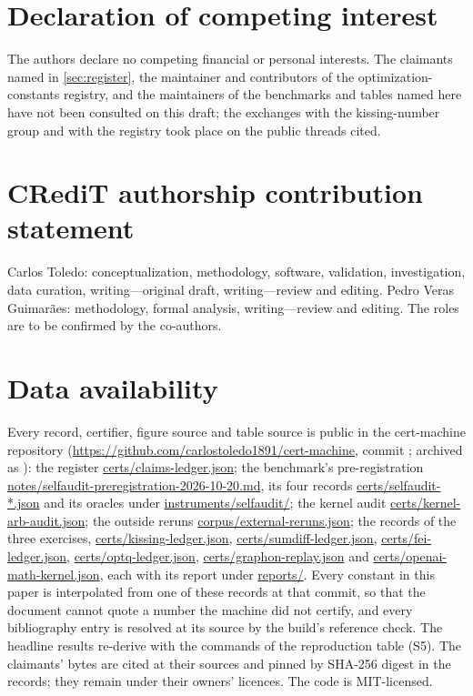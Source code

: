 \documentclass[preprint,11pt,a4paper]{elsarticle}
\theoremstyle{definition}
\newcommand{\supp}[1]{S#1}
\begin{document}
\section*{Declaration of competing interest}
The authors declare no competing financial or personal interests. The claimants named in \cref{sec:register}, the maintainer and contributors of the optimization-constants registry, and the maintainers of the benchmarks and tables named here have not been consulted on this draft; the exchanges with the kissing-number group and with the registry took place on the public threads cited.

\section*{CRediT authorship contribution statement}
Carlos Toledo: conceptualization, methodology, software, validation, investigation, data curation, writing---original draft, writing---review and editing. Pedro Veras Guimar\~aes: methodology, formal analysis, writing---review and editing. The roles are to be confirmed by the co-authors.

\section*{Data availability}
Every record, certifier, figure source and table source is public in the cert-machine repository (\url{https://github.com/carlostoledo1891/cert-machine}, commit \MtCommit; archived as \citep{CMArchive}): the register \url{certs/claims-ledger.json}; the benchmark's pre-registration \url{notes/selfaudit-preregistration-2026-10-20.md}, its four records \url{certs/selfaudit-*.json} and its oracles under \url{instruments/selfaudit/}; the kernel audit \url{certs/kernel-arb-audit.json}; the outside reruns \url{corpus/external-reruns.json}; the records of the three exercises, \url{certs/kissing-ledger.json}, \url{certs/sumdiff-ledger.json}, \url{certs/fei-ledger.json}, \url{certs/optq-ledger.json}, \url{certs/graphon-replay.json} and \url{certs/openai-math-kernel.json}, each with its report under \url{reports/}. Every constant in this paper is interpolated from one of these records at that commit, so that the document cannot quote a number the machine did not certify, and every bibliography entry is resolved at its source by the build's reference check. The headline results re-derive with the commands of the reproduction table (\supp{5}). The claimants' bytes are cited at their sources and pinned by SHA-256 digest in the records; they remain under their owners' licences. The code is MIT-licensed.
\end{document}
